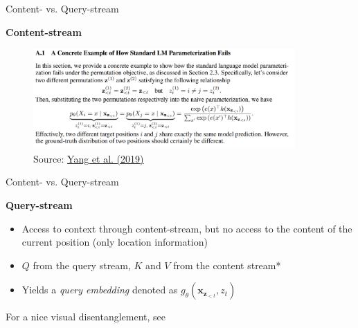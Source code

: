 
\begin{frame}{Content- vs. Query-stream}

\vfill

	\textbf{Content-stream}
	
	\begin{figure}
		\centering
		\includegraphics[width = 10cm]{figure/xlnet-a1.png}\\ 
		{\footnotesize Source: \href{https://papers.nips.cc/paper/8812-xlnet-generalized-autoregressive-pretraining-for-language-understanding.pdf}{Yang et al. (2019)}}
	\end{figure}
	
\vfill

\end{frame}


\begin{frame}{Content- vs. Query-stream}

\vfill
	
	\textbf{Query-stream}
	
	\begin{itemize}
		\item Access to context through content-stream, but no access to the content of the current position (only location information)
		\item $Q$ from the query stream, $K$ and $V$ from the content stream*
		\item Yields a \textit{query embedding} denoted as $g_{\theta}(\mathbf{x}_{\mathbf{z}_{< t}}, z_t)$
	\end{itemize}

	\vspace{.3cm}
	
	{\footnotesize *For a nice visual disentanglement, see \href{https://arxiv.org/pdf/1906.08237.pdf}{}}
	
\vfill

\end{frame}

